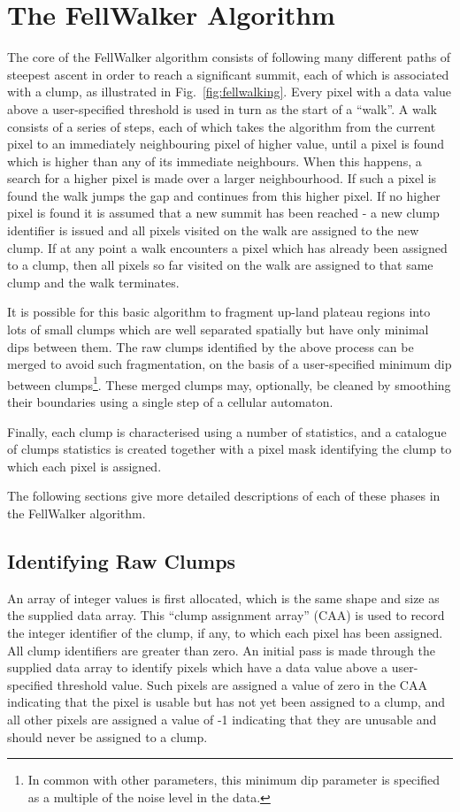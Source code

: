 \documentclass[final,authoryear,5p,times,twocolumn]{elsarticle}
\begin{document}
\section{The FellWalker Algorithm}

The core of the FellWalker algorithm consists of following many different
paths of steepest ascent in order to reach a significant summit, each of
which is associated with a clump, as illustrated in Fig.~\ref{fig:fellwalking}.
Every pixel with a data value above a user-specified threshold is used in
turn as the start of a ``walk''. A walk consists of a series of steps,
each of which takes the algorithm from the current pixel to an immediately
neighbouring pixel of higher value, until a pixel is found which is
higher than any of its immediate neighbours. When this happens, a search
for a higher pixel is made over a larger neighbourhood. If such a pixel
is found the walk jumps the gap and continues from this higher pixel. If no
higher pixel is found it is assumed that a new summit has been reached -
a new clump identifier is issued and all pixels visited on the walk are
assigned to the new clump. If at any point a walk encounters a pixel
which has already been assigned to a clump, then all pixels so far
visited on the walk are assigned to that same clump and the walk
terminates.

It is possible for this basic algorithm to fragment up-land plateau
regions into lots of small clumps which are well separated spatially but
have only minimal dips between them. The raw clumps identified by the above
process can be merged to avoid such fragmentation, on the basis of a
user-specified minimum dip between clumps\footnote{In common with other
parameters, this minimum dip parameter is specified as a multiple of the
noise level in the data.}. These merged clumps may,
optionally, be cleaned by smoothing their boundaries using a single step
of a cellular automaton.

Finally, each clump is characterised using a number of statistics, and a
catalogue of clumps statistics is created together with a pixel mask
identifying the clump to which each pixel is assigned.

The following sections give more detailed descriptions of each of these
phases in the FellWalker algorithm.

\subsection{Identifying Raw Clumps}
\label{sec:raw}
An array of integer values is first allocated, which is the same shape
and size as the supplied data array. This ``clump assignment array''
(CAA) is used to record the integer identifier of the clump, if any, to
which each pixel has been assigned. All clump identifiers are greater
than zero. An initial pass is made through the supplied data array to
identify pixels which have a data value above a user-specified threshold
value. Such pixels are assigned a value of zero in the CAA indicating
that the pixel is usable but has not yet been assigned to a clump, and
all other pixels are assigned a value of -1 indicating that they are
unusable and should never be assigned to a clump.
\end{document}
